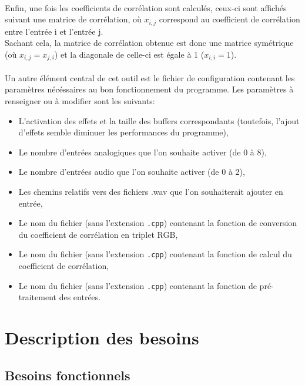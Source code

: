 \documentclass{article}
\begin{document}
    \paragraph{}
    Enfin, une fois les coefficients de corrélation sont calculés, ceux-ci sont
    affichés suivant une matrice de corrélation, où $x_{i,j}$ correspond au
    coefficient de corrélation entre l'entrée i et l'entrée j.\\
    Sachant cela, la matrice de corrélation obtenue est donc une matrice
    symétrique (où $x_{i,j} = x_{j,i}$) et la diagonale de celle-ci est égale à
    1 ($x_{i,i} = 1$).
    \paragraph{}
    Un autre élément central de cet outil est le fichier de configuration
    contenant les paramètres nécéssaires au bon fonctionnement du programme. Les
    paramètres à renseigner ou à modifier sont les suivants:
    \begin{itemize}
      \item L'activation des effets et la taille des buffers correspondants
      (toutefois, l'ajout d'effets semble diminuer les performances du
      programme),
      \item Le nombre d'entrées analogiques que l'on souhaite activer (de 0 à 8),
      \item Le nombre d'entrées audio que l'on souhaite activer (de 0 à 2),
      \item Les chemins relatifs vers des fichiers .wav que l'on souhaiterait
      ajouter en entrée,
      \item Le nom du fichier (sans l'extension \verb!.cpp!) contenant la
      fonction de conversion du coefficient de corrélation en triplet RGB,
      \item Le nom du fichier (sans l'extension \verb!.cpp!) contenant la
      fonction de calcul du coefficient de corrélation,
      \item Le nom du fichier (sans l'extension \verb!.cpp!) contenant la
      fonction de pré-traitement des entrées.
    \end{itemize}
  \section{Description des besoins}
    \subsection{Besoins fonctionnels}
\end{document}
